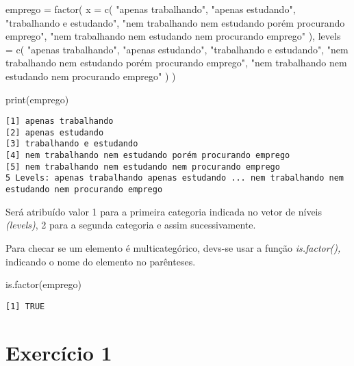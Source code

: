 \documentclass[
  letterpaper,
  DIV=11,
  numbers=noendperiod]{scrreprt}
\newenvironment{Shaded}{\begin{snugshade}}{\end{snugshade}}
\newcommand{\AttributeTok}[1]{\textcolor[rgb]{0.40,0.45,0.13}{#1}}
\newcommand{\FunctionTok}[1]{\textcolor[rgb]{0.28,0.35,0.67}{#1}}
\newcommand{\NormalTok}[1]{\textcolor[rgb]{0.00,0.23,0.31}{#1}}
\newcommand{\OtherTok}[1]{\textcolor[rgb]{0.00,0.23,0.31}{#1}}
\newcommand{\StringTok}[1]{\textcolor[rgb]{0.13,0.47,0.30}{#1}}
\begin{document}
\begin{Shaded}
\begin{Highlighting}[]
\NormalTok{emprego }\OtherTok{=} \FunctionTok{factor}\NormalTok{(}
  \AttributeTok{x =} \FunctionTok{c}\NormalTok{(}
    \StringTok{"apenas trabalhando"}\NormalTok{, }
    \StringTok{"apenas estudando"}\NormalTok{, }
    \StringTok{"trabalhando e estudando"}\NormalTok{, }
    \StringTok{"nem trabalhando nem estudando porém procurando emprego"}\NormalTok{,}
    \StringTok{"nem trabalhando nem estudando nem procurando emprego"}
\NormalTok{  ),}
  \AttributeTok{levels =} \FunctionTok{c}\NormalTok{(}
    \StringTok{"apenas trabalhando"}\NormalTok{, }
    \StringTok{"apenas estudando"}\NormalTok{, }
    \StringTok{"trabalhando e estudando"}\NormalTok{, }
    \StringTok{"nem trabalhando nem estudando porém procurando emprego"}\NormalTok{,}
    \StringTok{"nem trabalhando nem estudando nem procurando emprego"}
\NormalTok{  )}
\NormalTok{)}

\FunctionTok{print}\NormalTok{(emprego)}
\end{Highlighting}
\end{Shaded}

\begin{verbatim}
[1] apenas trabalhando                                    
[2] apenas estudando                                      
[3] trabalhando e estudando                               
[4] nem trabalhando nem estudando porém procurando emprego
[5] nem trabalhando nem estudando nem procurando emprego  
5 Levels: apenas trabalhando apenas estudando ... nem trabalhando nem estudando nem procurando emprego
\end{verbatim}

Será atribuído valor 1 para a primeira categoria indicada no vetor de
níveis \emph{(levels)}, 2 para a segunda categoria e assim
sucessivamente.

Para checar se um elemento é multicategórico, devs-se usar a função
\emph{is.factor(),} indicando o nome do elemento no parênteses.

\begin{Shaded}
\begin{Highlighting}[]
\FunctionTok{is.factor}\NormalTok{(emprego)}
\end{Highlighting}
\end{Shaded}

\begin{verbatim}
[1] TRUE
\end{verbatim}

\section{Exercício 1}\label{exercuxedcio-1-1}
\end{document}
